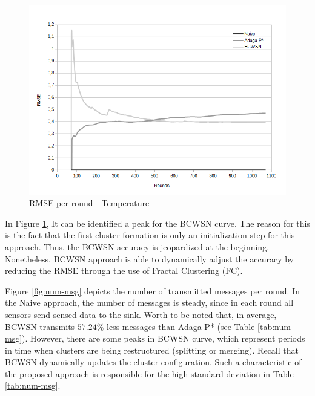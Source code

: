 \documentclass{acm_proc_article-sp}
\begin{document}
\begin{figure}[!htb]
\begin{center}
	\includegraphics[scale=0.4]{BCWSN-RMSExRound-PB-Temp.png}
	 \vspace*{-.5cm}
    \caption{RMSE per round - Temperature}
    \label{fig:rmse}
\end{center}
\end{figure}
\vspace*{-.3cm}

In Figure \ref{fig:rmse}, It can be identified a peak for the BCWSN curve. The
reason for this is the fact that the first cluster formation is only an
initialization step for this approach. Thus, the BCWSN accuracy is jeopardized at
the beginning. Nonetheless, BCWSN approach is able to dynamically adjust the
accuracy by reducing the RMSE through the use of Fractal Clustering (FC).
\vspace*{-.3cm}

Figure \ref{fig:num-msg} depicts the number of transmitted messages
per round. In the Naive approach, the number of messages is steady, since in
each round all sensors send sensed data to the sink. Worth to be noted 
that, in average, BCWSN transmits $57.24\%$ less messages than Adaga-P* (see Table
\ref{tab:num-msg}). However, there are some peaks in BCWSN curve, which
represent periods in time when clusters are being restructured (splitting or
merging). Recall that BCWSN dynamically updates the cluster configuration. Such
a characteristic of the proposed approach is responsible for the high standard
deviation in Table \ref{tab:num-msg}.
\vspace*{-.3cm}
\end{document}
